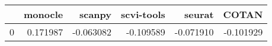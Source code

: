 \begin{tabular}{lrrrrr}
\toprule
 & monocle & scanpy & scvi-tools & seurat & COTAN \\
\midrule
0 & 0.171987 & -0.063082 & -0.109589 & -0.071910 & -0.101929 \\
\bottomrule
\end{tabular}
